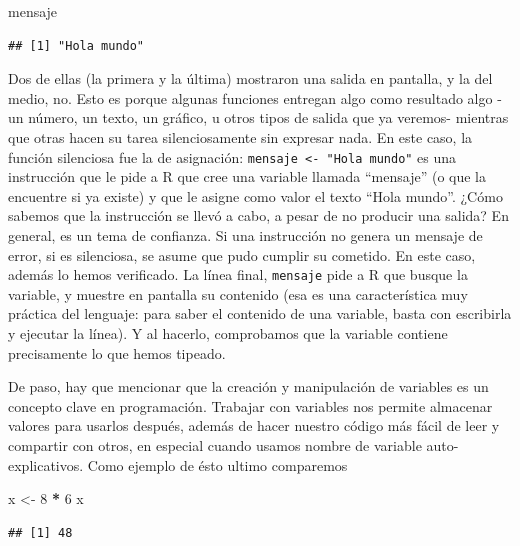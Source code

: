 \documentclass[]{book}
\newenvironment{Shaded}{\begin{snugshade}}{\end{snugshade}}
\newcommand{\DecValTok}[1]{\textcolor[rgb]{0.00,0.00,0.81}{#1}}
\newcommand{\StringTok}[1]{\textcolor[rgb]{0.31,0.60,0.02}{#1}}
\newcommand{\OperatorTok}[1]{\textcolor[rgb]{0.81,0.36,0.00}{\textbf{#1}}}
\newcommand{\NormalTok}[1]{#1}
\begin{document}
\begin{Shaded}
\begin{Highlighting}[]
\NormalTok{mensaje}
\end{Highlighting}
\end{Shaded}

\begin{verbatim}
## [1] "Hola mundo"
\end{verbatim}

Dos de ellas (la primera y la última) mostraron una salida en pantalla,
y la del medio, no. Esto es porque algunas funciones entregan algo como
resultado algo -un número, un texto, un gráfico, u otros tipos de salida
que ya veremos- mientras que otras hacen su tarea silenciosamente sin
expresar nada. En este caso, la función silenciosa fue la de asignación:
\texttt{mensaje\ \textless{}-\ "Hola\ mundo"} es una instrucción que le
pide a R que cree una variable llamada ``mensaje'' (o que la encuentre
si ya existe) y que le asigne como valor el texto ``Hola mundo''. ¿Cómo
sabemos que la instrucción se llevó a cabo, a pesar de no producir una
salida? En general, es un tema de confianza. Si una instrucción no
genera un mensaje de error, si es silenciosa, se asume que pudo cumplir
su cometido. En este caso, además lo hemos verificado. La línea final,
\texttt{mensaje} pide a R que busque la variable, y muestre en pantalla
su contenido (esa es una característica muy práctica del lenguaje: para
saber el contenido de una variable, basta con escribirla y ejecutar la
línea). Y al hacerlo, comprobamos que la variable contiene precisamente
lo que hemos tipeado.

De paso, hay que mencionar que la creación y manipulación de variables
es un concepto clave en programación. Trabajar con variables nos permite
almacenar valores para usarlos después, además de hacer nuestro código
más fácil de leer y compartir con otros, en especial cuando usamos
nombre de variable auto-explicativos. Como ejemplo de ésto ultimo
comparemos

\begin{Shaded}
\begin{Highlighting}[]
\NormalTok{x <-}\StringTok{ }\DecValTok{8} \OperatorTok{*}\StringTok{ }\DecValTok{6}
\NormalTok{x}
\end{Highlighting}
\end{Shaded}

\begin{verbatim}
## [1] 48
\end{verbatim}
\end{document}
